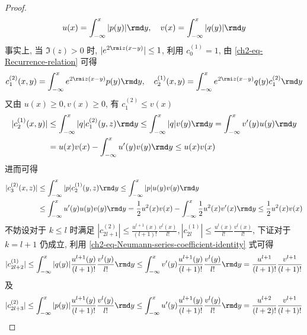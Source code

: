 \begin{proof}
\begin{equation}
        u(x) = \int_{-\infty}^{x} |p(y)| \rmd y, \quad v(x) = \int_{-\infty}^{x} |q(y)| \rmd y
    \end{equation}
    事实上, 当 $ \Im(z) > 0 $ 时, $ |e^{2 \rmi z (x-y)} | \leq 1 $, 利用 $ c_{0}^{(1)} = 1 $, 由 \eqref{ch2-eq-Recurrence-relation} 可得
    \begin{equation}
        c_{1}^{(2)}(x,y) = \int_{-\infty}^{x} e^{2 \rmi z(x-y)} p(y) \rmd y, \quad c_{2}^{(1)}(x,y) = \int_{-\infty}^{x} e^{2 \rmi z(x-y)} q(y) c_{1}^{(2)} \rmd y
    \end{equation}
    又由 $ u(x) \geq 0, v(x) \geq 0 $, 有 $ c_{1}^{(2)} \leq v(x) $
    \begin{equation}
        \begin{aligned}
            |c_{2}^{(1)}(x,y)| & \leq \int_{-\infty}^{x} | q |  c_{1}^{(2)}(y,z) \rmd y \leq  \int_{-\infty}^{x} | q | v(y) \rmd y = \int_{-\infty}^{x} v'(y) u(y) \rmd y \\
                               & = u(x) v(x) - \int_{-\infty}^{x} u'(y) v(y) \rmd y \leq u(x)v(x)
        \end{aligned}
    \end{equation}
    进而可得
    \begin{equation}
        \begin{aligned}
            | c_{3}^{(2)}(x,z) | & \leq \int_{-\infty}^{x} | p | c_{2}^{(1)}(y,z) \rmd y \leq \int_{-\infty}^{x} | p | u(y) v(y) \rmd y                                                        \\
                                 & \leq \int_{-\infty}^{x} u'(y) u(y) v(y) \rmd y = \frac{1}{2}u^2(x) v(x) - \int_{-\infty}^{x} \frac{1}{2}u^2(x) v'(x)  \rmd y \leq \frac{1}{2} u^{2}(x) v(x)
        \end{aligned}
    \end{equation}
    不妨设对于 $ k \leq l $ 时满足 $  | c_{2l+1}^{(2)} | \leq \frac{u^{l+1}(x)}{(l+1)!} \frac{v^{l}(x)}{l!}, | c_{2l}^{(1)} | \leq \frac{u^{l}(x)}{l!} \frac{v^{l}(x)}{l!} $, 下证对于 $ k = l +1 $ 仍成立, 利用 \eqref{ch2-eq-Neumann-series-coefficient-identity} 式可得
    \begin{equation}
        | c_{2l+2}^{(1)} | \leq \int_{-\infty}^{x} | q(y) | \frac{u^{l+1}(y)}{(l+1)!} \frac{v^{l}(y)}{l!} \rmd y \leq \int_{-\infty}^{x} v'(y) \frac{u^{l+1}(y)}{(l+1)!} \frac{v^{l}(y)}{l!} \rmd y = \frac{u^{l+1}}{(l+1)!}  \frac{v^{l+1}}{(l+1)!}
    \end{equation}
    及
    \begin{equation}
        | c_{2l+3}^{(2)} | \leq \int_{-\infty}^{x} | p(y) | \frac{u^{l+1}(y)}{(l+1)!} \frac{v^{l}(y)}{l!} \rmd y \leq \int_{-\infty}^{x} u'(y) \frac{u^{l+1}(y)}{(l+1)!} \frac{v^{l}(y)}{l!} \rmd y = \frac{u^{l+2}}{(l+2)!}  \frac{v^{l+1}}{(l+1)!}

\end{equation}
\end{proof}
